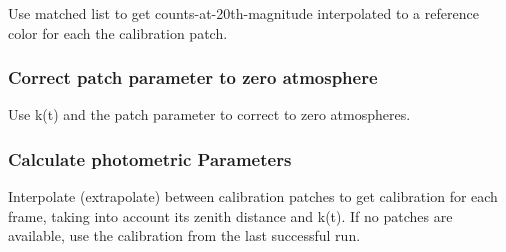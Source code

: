 Use matched list to get counts-at-20th-magnitude interpolated to a
reference color for each the calibration patch.

\subsubsection{Correct patch parameter to zero atmosphere}

Use k(t) and the patch parameter to correct to zero atmospheres.

\subsubsection{Calculate photometric Parameters}

Interpolate (extrapolate) between calibration patches to get
calibration for each frame, taking into account its zenith distance
and k(t). If no patches are available, use the calibration from the
last successful run.
